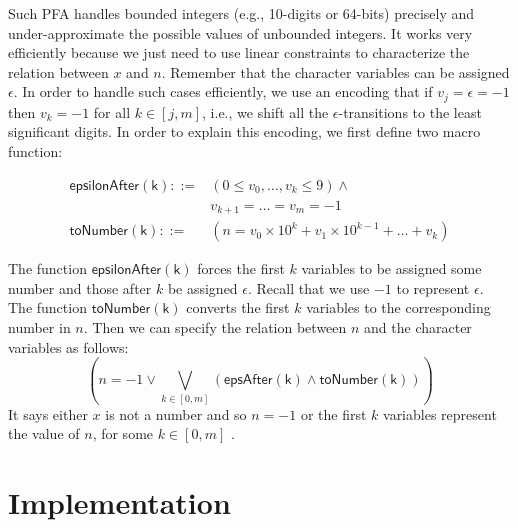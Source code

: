 \documentclass[sigplan,review,anonymous]{acmart}\settopmatter{printfolios=true,printccs=false,printacmref=false}
\begin{document}
Such PFA handles bounded integers (e.g., 10-digits or 64-bits) precisely and under-approximate the possible values of unbounded integers. It works very efficiently because we just need to use linear constraints to characterize the relation between $x$ and $n$. 
Remember that the character variables can be assigned $\epsilon$. In order to handle such cases efficiently, we use an encoding that if $v_j = \epsilon = -1$ then $v_k = -1$ for all $k\in [j,m]$, i.e., we shift all the $\epsilon$-transitions to the least significant digits. In order to explain this encoding, we first define two macro function:

$$\begin{array}{rl}
\mathsf{epsilonAfter(k)}::=& (0\leq v_0,\ldots, v_k\leq 9) \wedge\\
&v_{k+1}=\ldots =v_m = -1\\
\mathsf{toNumber(k)}::=& (n = v_0\times 10^{k} + v_1\times 10^{k-1} + \ldots + v_{k})
\end{array}
$$

The function $\mathsf{epsilonAfter(k)}$ forces the first $k$ variables to be assigned some number and those after $k$ be assigned $\epsilon$. Recall that we use $-1$ to represent $\epsilon$. The function $\mathsf{toNumber(k)}$ converts the first $k$ variables to the corresponding number in $n$.
Then we can specify the relation between $n$ and the character variables as follows:
$$(n=-1 \vee \bigvee_{k\in [0,m]} (\mathsf{epsAfter(k)} \wedge \mathsf{toNumber(k)} ) )$$
It says either $x$ is not a number and so $n=-1$ or the first $k$ variables represent the value of $n$, for some $k\in [0,m]$ .





\section{Implementation}\label{section:implementation}




\end{document}
